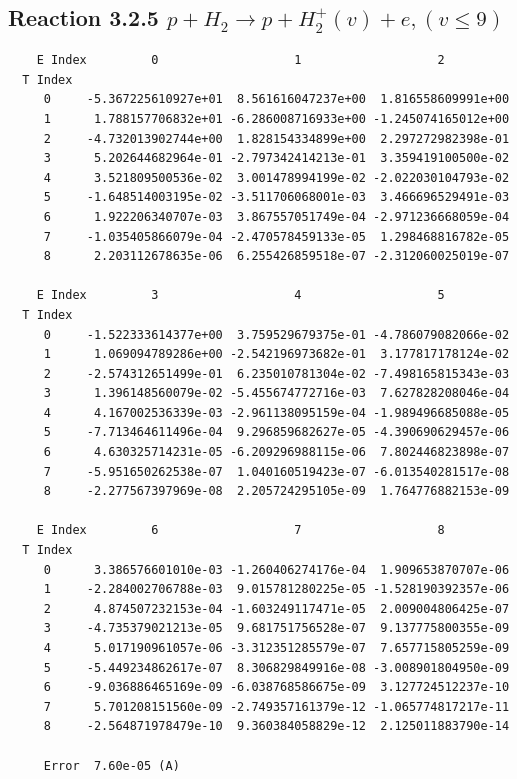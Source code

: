 \documentclass[12pt,dvipdfmx]{article}
\begin{document}
\newpage
\subsection{
Reaction 3.2.5 $   p + H_2 \rightarrow p + H_2^+(v) + e, (v \leq 9)$}


\begin{small}\begin{verbatim}
    E Index         0                   1                   2
  T Index
     0     -5.367225610927e+01  8.561616047237e+00  1.816558609991e+00
     1      1.788157706832e+01 -6.286008716933e+00 -1.245074165012e+00
     2     -4.732013902744e+00  1.828154334899e+00  2.297272982398e-01
     3      5.202644682964e-01 -2.797342414213e-01  3.359419100500e-02
     4      3.521809500536e-02  3.001478994199e-02 -2.022030104793e-02
     5     -1.648514003195e-02 -3.511706068001e-03  3.466696529491e-03
     6      1.922206340707e-03  3.867557051749e-04 -2.971236668059e-04
     7     -1.035405866079e-04 -2.470578459133e-05  1.298468816782e-05
     8      2.203112678635e-06  6.255426859518e-07 -2.312060025019e-07

    E Index         3                   4                   5
  T Index
     0     -1.522333614377e+00  3.759529679375e-01 -4.786079082066e-02
     1      1.069094789286e+00 -2.542196973682e-01  3.177817178124e-02
     2     -2.574312651499e-01  6.235010781304e-02 -7.498165815343e-03
     3      1.396148560079e-02 -5.455674772716e-03  7.627828208046e-04
     4      4.167002536339e-03 -2.961138095159e-04 -1.989496685088e-05
     5     -7.713464611496e-04  9.296859682627e-05 -4.390690629457e-06
     6      4.630325714231e-05 -6.209296988115e-06  7.802446823898e-07
     7     -5.951650262538e-07  1.040160519423e-07 -6.013540281517e-08
     8     -2.277567397969e-08  2.205724295105e-09  1.764776882153e-09

    E Index         6                   7                   8
  T Index
     0      3.386576601010e-03 -1.260406274176e-04  1.909653870707e-06
     1     -2.284002706788e-03  9.015781280225e-05 -1.528190392357e-06
     2      4.874507232153e-04 -1.603249117471e-05  2.009004806425e-07
     3     -4.735379021213e-05  9.681751756528e-07  9.137775800355e-09
     4      5.017190961057e-06 -3.312351285579e-07  7.657715805259e-09
     5     -5.449234862617e-07  8.306829849916e-08 -3.008901804950e-09
     6     -9.036886465169e-09 -6.038768586675e-09  3.127724512237e-10
     7      5.701208151560e-09 -2.749357161379e-12 -1.065774817217e-11
     8     -2.564871978479e-10  9.360384058829e-12  2.125011883790e-14

     Error  7.60e-05 (A)
\end{verbatim}\end{small}
\end{document}
